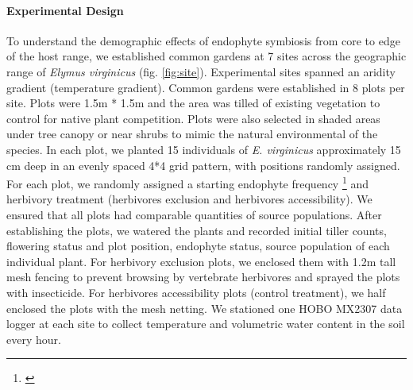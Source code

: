 \documentclass[12pt]{article}\usepackage[]{graphicx}\usepackage[dvipsnames]{xcolor}
\newcommand{\jacob}[2]{{\color{blue}{#1}}\footnote{\textit{\color{blue}{#2}}}}
\begin{document}
\paragraph {Experimental Design} 
To understand the demographic effects of endophyte symbiosis from core to edge of the host range, we established  common gardens at 7 sites across the geographic range of \emph {Elymus virginicus} (fig. \ref{fig:site}).
Experimental sites spanned an aridity gradient (temperature gradient).
Common gardens were established in 8 plots per site. 
Plots were 1.5m * 1.5m and the area was tilled of existing vegetation to control for native plant competition.
Plots were also selected in shaded areas under tree canopy or near shrubs to mimic the natural environmental of the species.
In each plot,  we planted 15 individuals  of \emph{E. virginicus} approximately 15 cm deep in an evenly spaced 4*4 grid pattern, with positions randomly assigned. 
For each plot, we randomly assigned a starting endophyte frequency  \jacob{(80\%, 60\%, 40\%, 20\%)}{Do we need a schematic of one replicate
of the experimental design?} and herbivory treatment (herbivores exclusion and herbivores accessibility). 
We ensured that all plots had comparable quantities of source populations.
After establishing the plots, we watered the plants and recorded initial tiller counts, flowering status and plot position,  endophyte status, source population of each individual plant. 
For herbivory exclusion plots, we enclosed them with 1.2m tall mesh fencing to prevent browsing by vertebrate herbivores and sprayed the plots with insecticide. 
For herbivores accessibility plots (control treatment), we half enclosed the plots with the mesh netting.
We stationed one HOBO MX2307 data logger at each site to collect temperature and volumetric water content in the soil every hour. 
\end{document}
